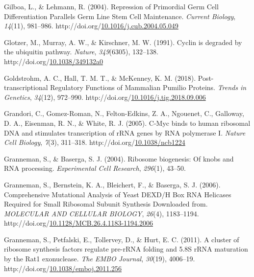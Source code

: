 \documentclass[12pt,oneside]{reedthesis}
\newlength{\cslhangindent}
\newenvironment{CSLReferences}[2] %
 {%
  \setlength{\parindent}{0pt}
  \ifodd #1 \everypar{\setlength{\hangindent}{\cslhangindent}}\ignorespaces\fi
  \ifnum #2 > 0
  \setlength{\parskip}{#2\baselineskip}
  \fi
 }%
 {}
\begin{document}
\begin{CSLReferences}{1}{0}
\leavevmode{}%
Gilboa, L., \& Lehmann, R. (2004). Repression of {Primordial Germ Cell Differentiation Parallels Germ Line Stem Cell Maintenance}. \emph{Current Biology}, \emph{14}(11), 981--986. http://doi.org/\href{https://doi.org/10.1016/j.cub.2004.05.049}{10.1016/j.cub.2004.05.049}

\leavevmode{}%
Glotzer, M., Murray, A. W., \& Kirschner, M. W. (1991). Cyclin is degraded by the ubiquitin pathway. \emph{Nature}, \emph{349}(6305), 132--138. http://doi.org/\href{https://doi.org/10.1038/349132a0}{10.1038/349132a0}

\leavevmode{}%
Goldstrohm, A. C., Hall, T. M. T., \& McKenney, K. M. (2018). Post-transcriptional {Regulatory Functions} of {Mammalian Pumilio Proteins}. \emph{Trends in Genetics}, \emph{34}(12), 972--990. http://doi.org/\href{https://doi.org/10.1016/j.tig.2018.09.006}{10.1016/j.tig.2018.09.006}

\leavevmode{}%
Grandori, C., Gomez-Roman, N., Felton-Edkins, Z. A., Ngouenet, C., Galloway, D. A., Eisenman, R. N., \& White, R. J. (2005). C-{Myc} binds to human ribosomal {DNA} and stimulates transcription of {rRNA} genes by {RNA} polymerase {I}. \emph{Nature Cell Biology}, \emph{7}(3), 311--318. http://doi.org/\href{https://doi.org/10.1038/ncb1224}{10.1038/ncb1224}

\leavevmode{}%
Granneman, S., \& Baserga, S. J. (2004). Ribosome biogenesis: Of knobs and {RNA} processing. \emph{Experimental Cell Research}, \emph{296}(1), 43--50.

\leavevmode{}%
Granneman, S., Bernstein, K. A., Bleichert, F., \& Baserga, S. J. (2006). Comprehensive {Mutational Analysis} of {Yeast DEXD}/{H Box RNA Helicases Required} for {Small Ribosomal Subunit Synthesis Downloaded} from. \emph{MOLECULAR AND CELLULAR BIOLOGY}, \emph{26}(4), 1183--1194. http://doi.org/\href{https://doi.org/10.1128/MCB.26.4.1183-1194.2006}{10.1128/MCB.26.4.1183-1194.2006}

\leavevmode{}%
Granneman, S., Petfalski, E., Tollervey, D., \& Hurt, E. C. (2011). A cluster of ribosome synthesis factors regulate pre-{rRNA} folding and 5.{8S rRNA} maturation by the {Rat1} exonuclease. \emph{The EMBO Journal}, \emph{30}(19), 4006--19. http://doi.org/\href{https://doi.org/10.1038/emboj.2011.256}{10.1038/emboj.2011.256}


\end{CSLReferences}
\end{document}
